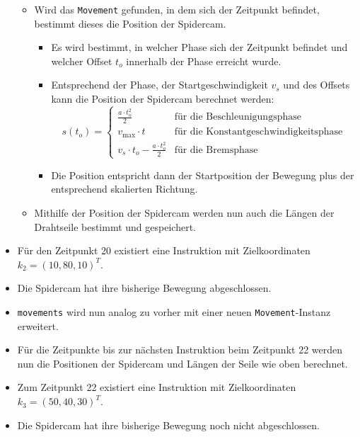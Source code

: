 \begin{itemize}
\begin{itemize}
              \item Wird das \texttt{Movement} gefunden, in dem sich der Zeitpunkt befindet, bestimmt dieses die Position der Spidercam.
                    \begin{itemize}
                        \item Es wird bestimmt, in welcher Phase sich der Zeitpunkt befindet und welcher Offset $t_o$ innerhalb der Phase erreicht wurde.
                        \item Entsprechend der Phase, der Startgeschwindigkeit $v_s$ und des Offsets kann die Position der Spidercam berechnet werden:
                              \[
                                  s(t_o) = \begin{cases}
                                      \frac{a\cdot t_o^2}{2}                   & \text{für die Beschleunigungsphase}          \\
                                      v_{\max} \cdot t                         & \text{für die Konstantgeschwindigkeitsphase} \\
                                      v_{s} \cdot t_o - \frac{a\cdot t_o^2}{2} & \text{für die Bremsphase}
                                  \end{cases}
                              \]
                        \item Die Position entspricht dann der Startposition der Bewegung plus der entsprechend skalierten Richtung.
                    \end{itemize}
              \item Mithilfe der Position der Spidercam werden nun auch die Längen der Drahtseile bestimmt und gespeichert.
          \end{itemize}
    \item Für den Zeitpunkt 20 existiert eine Instruktion mit Zielkoordinaten $k_2 = (10, 80, 10)^T$.
    \item Die Spidercam hat ihre bisherige Bewegung abgeschlossen.
    \item \texttt{movements} wird nun analog zu vorher mit einer neuen \texttt{Movement}-Instanz erweitert.
    \item Für die Zeitpunkte bis zur nächsten Instruktion beim Zeitpunkt 22 werden nun die Positionen der Spidercam und Längen der Seile wie oben berechnet.
    \item Zum Zeitpunkt 22 existiert eine Instruktion mit Zielkoordinaten $k_3 = (50, 40, 30)^T$.
    \item Die Spidercam hat ihre bisherige Bewegung noch nicht abgeschlossen.

\end{itemize}
